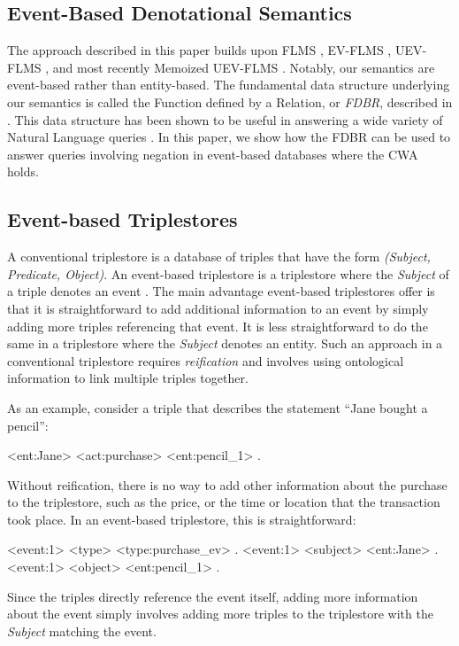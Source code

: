 \documentclass[../main.tex]{subfiles}
\begin{document}
\begin{refsection}

\section{Event-Based Denotational Semantics}
\label{webist2020conf:event}

\noindent The approach described in this paper builds upon FLMS \cite{frost1989constructing}, EV-FLMS \cite{frost2014demonstration}, UEV-FLMS \cite{peelar2016accommodating}, and most recently
Memoized UEV-FLMS \cite{peelar2020webistjournal}.  Notably, our semantics are event-based rather than entity-based.  The fundamental data structure underlying our semantics is called the Function defined by a Relation, or \textit{FDBR}, described in .  This data structure has been shown to be useful in answering a wide variety of Natural Language queries \cite{frostpeelar2019}.  In this paper, we show how the FDBR can be used to answer queries involving negation in event-based databases where the CWA holds.

\subsection{Event-based Triplestores}

A conventional triplestore is a database of triples that have the form \textit{(Subject, Predicate, Object)}.
An event-based triplestore is a triplestore where the \textit{Subject} of a triple denotes an event \cite{frost2013event}\cite{frost2014demonstration}.
The main advantage event-based triplestores offer is that it is straightforward to add additional
information to an event by simply adding more triples referencing that event.  It is less straightforward to do the same in a triplestore where the \textit{Subject} denotes an entity.
Such an approach in a conventional triplestore requires \textit{reification} and involves using ontological information to link multiple triples together.

As an example, consider a triple that describes the statement ``Jane bought a pencil'':
\begin{code}
    <ent:Jane> <act:purchase> <ent:pencil_1> .
\end{code}
Without reification, there is no way to add other information about the purchase to the triplestore, such as the price, or the time or location that the transaction took place.
In an event-based triplestore, this is straightforward:
\begin{code}
    <event:1> <type> <type:purchase_ev> .
    <event:1> <subject> <ent:Jane> .
    <event:1> <object> <ent:pencil_1> .
\end{code}
Since the triples directly reference the event itself, adding more information about the event simply involves adding more triples to the triplestore with the \textit{Subject} matching the event.


\end{refsection}
\end{document}
